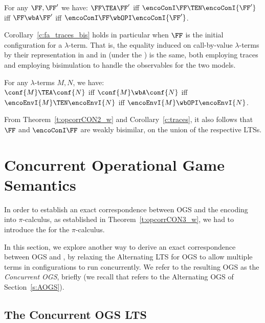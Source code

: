 \begin{corollary}
\label{c:fa_traces_bis}
For any $\FF,\FF'$ we have:
 $\FF\TEA \FF'$ iff 
$ \encoConI \FF \TEN \encoConI {\FF'}$
iff
 $\FF\wbA \FF'$ iff 
$ \encoConI \FF \wbOPI \encoConI {\FF'}$.
 \end{corollary} 

\noindent
Corollary~\ref{c:fa_traces_bis}  holds in particular when $\FF$ is the initial configuration
for a $\lambda$-term.  That is, 
the equality induced on call-by-value $\lambda$-terms by  
their representation in \AOGS and in \piI 
(under the \opLTS) is the same, both employing traces and employing bisimulation 
to handle   the observables for the two
models. 
\begin{corollary}
\label{c:OGS_opLTSpiI}
For any $\lambda$-terms $M,N$,  we have: 
\\
$\conf{M} \TEA \conf {N}$ iff
$\conf{M} \wbA \conf {N}$ iff
$\encoEnvI {{M} } \TEN\encoEnvI {{N}}$ iff 
$\encoEnvI {{M}} \wbOPI \encoEnvI {{N}}$. 
\end{corollary} 

\noindent
From Theorem~\ref{t:opcorrCON2_w} and Corollary~\ref{c:traces}, it also follows that  $\FF$ and
$\encoConI \FF$ are weakly bisimilar,  on the union of the respective  LTSs.
\section{Concurrent Operational Game Semantics}
\label{s:cogs}

In order to establish an exact correspondence between OGS and the encoding into $\pi$-calculus,
as established in Theorem~\ref{t:opcorrCON3_w}, we had to introduce the \opLTS for the 
$\pi$-calculus.

In this section, we explore another way to derive an exact correspondence between OGS and \piI,
by relaxing the Alternating LTS for OGS to allow multiple terms in 
configurations to run concurrently. 
We refer to the resulting OGS as the \emph{Concurrent OGS}, briefly \COGS (we
recall that  \AOGS refers to the Alternating  OGS of Section~\ref{s:AOGS}).  

\subsection{The Concurrent OGS LTS}
\label{ss:cs_cogs-lts}


